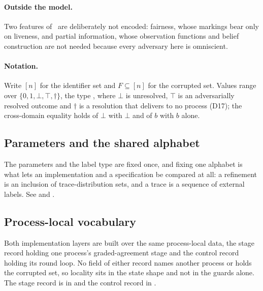 \paragraph{Outside the model.}
Two features of~\cite{LeslieBP} are deliberately not encoded: fairness, whose markings bear only on liveness, and partial information, whose observation functions and belief construction are not needed because every adversary here is omniscient.

\paragraph{Notation.}
Write $[n]$ for the identifier set and $F \subseteq [n]$ for the corrupted set.
Values range over $\{0,1,\bot,\top,\dagger\}$, the type , where $\bot$ is unresolved, $\top$ is an adversarially resolved outcome and $\dagger$ is a resolution that delivers to no process (D17); the cross-domain equality  holds of $\bot$ with $\bot$ and of $b$ with $b$ alone.

\subsection{Parameters and the shared alphabet}

The parameters and the label type are fixed once, and fixing one alphabet is what lets an implementation and a specification be compared at all: a refinement is an inclusion of trace-distribution sets, and a trace is a sequence of external labels.
See  and .




\subsection{Process-local vocabulary}

Both implementation layers are built over the same process-local data, the stage record holding one process's graded-agreement stage and the control record holding its round loop.
No field of either record names another process or holds the corrupted set, so locality sits in the state shape and not in the guards alone.
The stage record is in  and the control record in .




